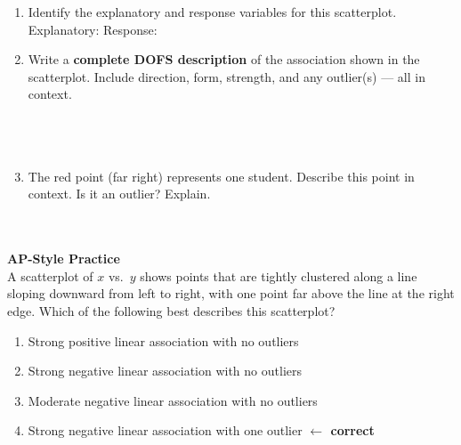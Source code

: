 \documentclass[10pt]{article}
\begin{document}
\begin{enumerate}[leftmargin=1.6em, itemsep=0.2in]

    \item Identify the explanatory and response variables for this scatterplot.\\[10pt]
          Explanatory:  \quad Response: 

    \item Write a \textbf{complete DOFS description} of the association shown in the scatterplot.
          Include direction, form, strength, and any outlier(s) --- all in context.\\[10pt]
          \\[3pt]
          \\[3pt]
          \\[3pt]

    \item The red point (far right) represents one student. Describe this point in context.
          Is it an outlier? Explain.\\[10pt]
          \\[3pt]
          \\[3pt]

\end{enumerate}

\vspace{0.16in}

\begin{tcolorbox}[colback=redbg, colframe=redacc, boxrule=0.8pt, arc=2mm,
    left=4mm, right=4mm, top=3mm, bottom=3mm]
\small\textbf{AP-Style Practice}\\[6pt]
A scatterplot of $x$ vs.\ $y$ shows points that are tightly clustered along a line sloping
downward from left to right, with one point far above the line at the right edge. Which of the
following best describes this scatterplot?

\vspace{10pt}
\begin{enumerate}[label=\textbf{(\Alph*)}, leftmargin=2em, itemsep=6pt]
  \item Strong positive linear association with no outliers
  \item Strong negative linear association with no outliers
  \item Moderate negative linear association with no outliers
  \item Strong negative linear association with one outlier \textcolor{keyred}{\textbf{$\leftarrow$ correct}}
\end{enumerate}
\end{tcolorbox}
\end{document}
